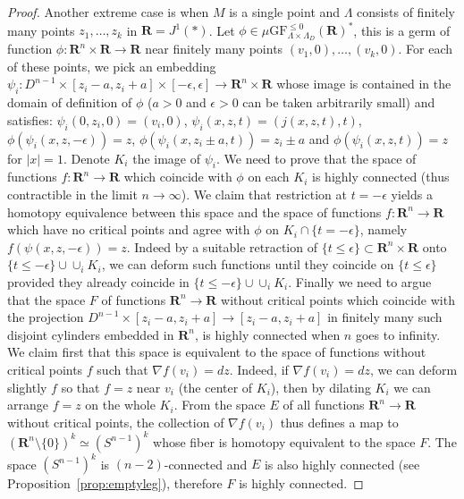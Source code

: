 \documentclass[10pt,a4paper]{amsart}
\newcommand{\GF}{\mathrm{GF}}
\newcommand{\R}{\mathbf{R}}
\begin{document}
\begin{proof}
Another extreme case is when $M$ is a single point and $\Lambda$ consists of finitely many points $z_1,\dots,z_k$ in $\R=J^1(*)$.
Let $\phi\in \mu\GF^{\leq 0}_{\Lambda\times \Lambda_D}(\R)^*$, this is a germ of function $\phi:\R^n\times \R \to \R$
near finitely many points $(v_1,0),\dots,(v_k,0)$. For each of these points, we pick an embedding $\psi_i:D^{n-1} \times [z_i-a,z_i+a]\times[-\epsilon,\epsilon]\to \R^n\times \R$ whose image is contained in the domain of definition of $\phi$ ($a>0$ and $\epsilon>0$ can be taken arbitrarily small) and satisfies:
$\psi_i(0,z_i,0)=(v_i,0)$, $\psi_i(x,z,t)=(j(x,z,t),t)$, $\phi(\psi_i(x,z,-\epsilon))=z$, $\phi(\psi_i(x,z_i\pm a,t))=z_i\pm a$
and $\phi(\psi_i(x,z,t))=z$ for $|x|=1$. Denote $K_i$ the image of $\psi_i$.
We need to prove that the space of functions $f:\R^n\to \R$ which coincide with $\phi$ on each $K_i$ is highly connected (thus contractible in the limit $n\to \infty$).
We claim that restriction at $t=-\epsilon$ yields a homotopy equivalence between this space and the space of functions
$f:\R^n\to \R$ which have no critical points and agree with $\phi$ on $K_i\cap\{t=-\epsilon\}$, namely $f(\psi(x,z,-\epsilon))=z$.
Indeed by a suitable retraction of $\{t\leq \epsilon\}\subset \R^n\times \R$ onto $\{t\leq -\epsilon\}\cup \cup_i K_i$, we can deform
such functions until they coincide on $\{t\leq \epsilon\}$ provided they already coincide in $\{t\leq-\epsilon\}\cup \cup_i K_i$.
Finally we need to argue that the space $F$ of functions $\R^n\to \R$ without critical points which coincide with the projection $D^{n-1}\times [z_i-a,z_i+a]\to [z_i-a,z_i+a]$ in finitely many such disjoint cylinders embedded in $\R^n$, is highly connected when $n$ goes to infinity.
We claim first that this space is equivalent to the space of functions without critical points $f$ such that $\nabla f(v_i)=dz$.
Indeed, if $\nabla f (v_i)=dz$, we can deform slightly $f$ so that $f=z$ near $v_i$ (the center of $K_i$), then by dilating $K_i$ we can arrange $f=z$
on the whole $K_i$. From the space $E$ of all functions $\R^n\to \R$ without critical points, the collection of $\nabla f(v_i)$ thus defines a map to $(\R^n\setminus\{0\})^k\simeq (S^{n-1})^k$ whose fiber is homotopy equivalent to the space $F$.
The space $(S^{n-1})^k$ is $(n-2)$-connected and $E$ is also highly connected (see Proposition~\ref{prop:emptyleg}), therefore $F$ is highly connected.


\end{proof}
\end{document}
